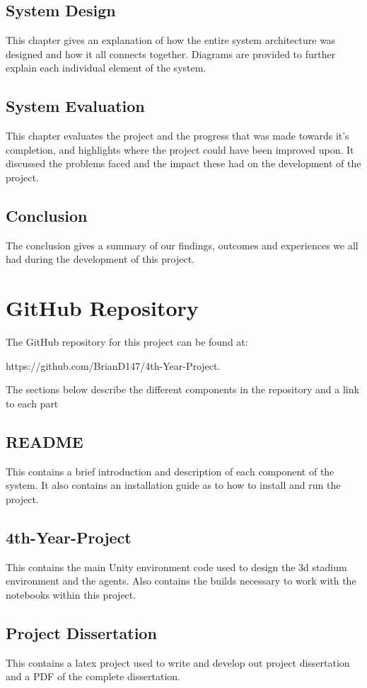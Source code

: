 \subsection{System Design}
This chapter gives an explanation of how the entire system architecture was designed and how it all connects together. Diagrams are provided to further explain each individual element of the system.

\subsection{System Evaluation}
This chapter evaluates the project and the progress that was made towards it's completion, and highlights where the project could have been improved upon. It discussed the problems faced and the impact these had on the development of the project.

\subsection{Conclusion}
The conclusion gives a summary of our findings, outcomes and experiences we all had during the development of this project.

\section{GitHub Repository}
The GitHub repository for this project can be found at:

    https://github.com/BrianD147/4th-Year-Project. 

The sections below describe the different components in the repository and a link to each part

\subsection{README}
This contains a brief introduction and description of each component of the system. It also contains an installation guide as to how to install and run the project.

\subsection{4th-Year-Project}
This contains the main Unity environment code used to design the 3d stadium environment and the agents. Also contains the builds necessary to work with the notebooks within this project.

\subsection{Project Dissertation}
This contains a latex project used to write and develop out project dissertation and a PDF of the complete dissertation.


